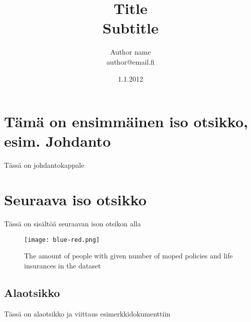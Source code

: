 \documentclass[a4paper]{article}
\begin{document}
\title{\huge Title \\ \large Subtitle}
\date{1.1.2012}
\author{Author name \\ author@email.fi}
\maketitle

\large

\section{Tämä on ensimmäinen iso otsikko, esim. Johdanto}

Tässä on johdantokappale

\section{Seuraava iso otsikko}

Tässä on sisältöä seuraavan ison otsikon alla

\begin{figure}[htb]
\centering
\texttt{[image: blue-red.png]}
\caption{The amount of people with given number of moped policies and life insurances in the dataset}
\label{01bar}
\end{figure}

\subsection{Alaotsikko}

Tässä on alaotsikko ja viittaus esimerkkidokumenttiin \citep{koski2012}




\end{document}

